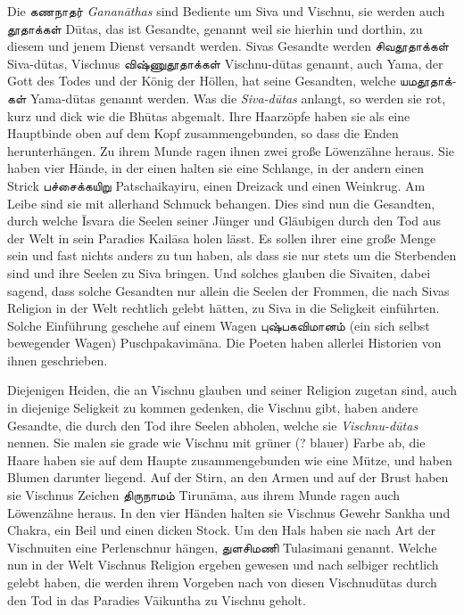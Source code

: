 \documentclass{article}
\newcommand{\TamilText}[1]{\texttamil{#1}}
\newcommand{\tam}[1]{\TamilText{#1}}
\begin{document}
Die \tam{கணநாதர்} \emph{Ganan\={a}thas} sind Bediente um Siva und Vischnu, sie werden auch \tam{தூதாக்கள்} D\={u}tas, das ist Gesandte, genannt weil sie hierhin und dorthin, zu diesem und jenem Dienst versandt werden. Sivas Gesandte werden \tam{சிவதூதாக்கள்} Siva-d\={u}tas, Vischnus \tam{விஷ்ணுதூதாக்கள்} Vischnu-d\={u}tas genannt, auch Yama, der Gott des Todes und der König der Höllen, hat seine Gesandten, welche \tam{யமதூதாக்கள்} Yama-d\={u}tas genannt werden. Was die \emph{Siva-d\={u}tas} anlangt, so werden sie rot, kurz und dick wie die Bh\={u}tas abgemalt. Ihre Haarzöpfe haben sie als eine Hauptbinde oben auf dem Kopf zusammengebunden, so dass die Enden herunterhängen. Zu ihrem Munde ragen ihnen zwei große Löwenzähne heraus. Sie haben vier Hände, in der einen halten sie eine Schlange, in der andern einen Strick \tam{பச்சைக்கயிறு} Patschaikayiru, einen Dreizack und einen Weinkrug. Am Leibe sind sie mit allerhand Schmuck behangen. Dies sind nun die Gesandten, durch welche \={I}svara die Seelen seiner Jünger und Gläubigen durch den Tod aus der Welt in sein Paradies Kail\={a}sa holen lässt. Es sollen ihrer eine große Menge sein und fast nichts anders zu tun haben, als dass sie nur stets um die Sterbenden sind und ihre Seelen zu Siva bringen. Und solches glauben die Sivaiten, dabei sagend, dass solche Gesandten nur allein die Seelen der Frommen, die nach Sivas Religion in der Welt rechtlich gelebt hätten, zu Siva in die Seligkeit einführten. Solche Einführung geschehe auf einem Wagen \tam{புஷ்பகவிமானம்} (ein sich selbst bewegender Wagen) Puschpakavim\={a}na. Die Poeten haben allerlei Historien von ihnen geschrieben.

Diejenigen Heiden, die an Vischnu glauben und seiner Religion zugetan sind, auch in diejenige Seligkeit zu kommen gedenken, die Vischnu gibt, haben andere Gesandte, die durch den Tod ihre Seelen abholen, welche sie \emph{Vischnu-d\={u}tas} nennen. Sie malen sie grade wie Vischnu mit grüner (? blauer) Farbe ab, die Haare haben sie auf dem Haupte zusammengebunden wie eine Mütze, und haben Blumen darunter liegend. Auf der Stirn, an den Armen und auf der Brust haben sie Vischnus Zeichen \tam{திருநாமம்} Tirun\={a}ma, aus ihrem Munde ragen auch Löwenzähne heraus. In den vier Händen halten sie Vischnus Gewehr Sankha und Chakra, ein Beil und einen dicken Stock. Um den Hals haben sie nach Art der Vischnuiten eine Perlenschnur hängen, \tam{துளசிமணி} Tulasimani genannt. Welche nun in der Welt Vischnus Religion ergeben gewesen und nach selbiger rechtlich gelebt haben, die werden ihrem Vorgeben nach von diesen Vischnud\={u}tas durch den Tod in das Paradies V\={a}ikuntha zu Vischnu geholt.
\end{document}
